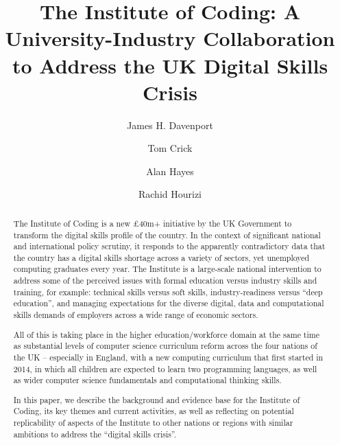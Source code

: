 \documentclass[sigconf,anonymous]{acmart}
\begin{document}
\title{The Institute of Coding: A University-Industry Collaboration to Address the UK Digital Skills Crisis}
\author{James H. Davenport}

\author{Tom Crick}

\author{Alan Hayes}

\author{Rachid Hourizi}
 

\renewcommand{\shortauthors}{Davenport, Crick, Hayes and Hourizi}


\begin{abstract}
The Institute of Coding is a new \pounds40m+ initiative by the UK
Government to transform the digital skills profile of the country. In
the context of significant national and international policy scrutiny, 
it responds to the apparently contradictory data that
the country has a digital skills shortage across a variety of sectors,
yet unemployed computing graduates every year. The Institute is a
large-scale national intervention to address some of the perceived
issues with formal education versus industry skills and training, for
example: technical skills versus soft skills, industry-readiness
versus ``deep education'', and managing expectations for the diverse
digital, data and computational skills demands of employers across a
wide range of economic sectors.

All of this is taking place in the higher education/workforce domain
at the same time as substantial levels of computer science curriculum
reform across the four nations of the UK -- especially in England,
with a new computing curriculum that first started in 2014, in which
all children are expected to learn two programming languages, as well
as wider computer science fundamentals and computational thinking
skills.

In this paper, we describe the background and evidence base for the
Institute of Coding, its key themes and current activities, as
well as reflecting on potential replicability of aspects of the
Institute to other nations or regions with similar ambitions to
address the ``digital skills crisis''.
\end{abstract}
\end{document}
